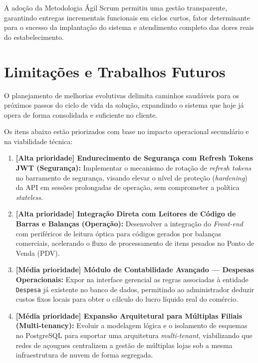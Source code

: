 \documentclass[
	12pt,				%
	openany,			%
	oneside,			%
	a4paper,			%
	english,			%
	french,				%
	spanish,			%
	brazil				%
	]{abntex2}
\begin{document}
A adoção da Metodologia Ágil Scrum permitiu uma gestão transparente, garantindo entregas incrementais funcionais em ciclos curtos, fator determinante para o sucesso da implantação do sistema e atendimento completo das dores reais do estabelecimento.

\section{Limitações e Trabalhos Futuros}

O planejamento de melhorias evolutivas delimita caminhos saudáveis para os próximos passos do ciclo de vida da solução, expandindo o sistema que hoje já opera de forma consolidada e suficiente no cliente.

Os itens abaixo estão priorizados com base no impacto operacional secundário e na viabilidade técnica:

\begin{enumerate}
    \item \textbf{[Alta prioridade] Endurecimento de Segurança com Refresh Tokens JWT (Segurança):} Implementar o mecanismo de rotação de \textit{refresh tokens} no barramento de segurança, visando elevar o nível de proteção (\textit{hardening}) da API em sessões prolongadas de operação, sem comprometer a política \textit{stateless}.
    
    \item \textbf{[Alta prioridade] Integração Direta com Leitores de Código de Barras e Balanças (Operação):} Desenvolver a integração do \textit{Front-end} com periféricos de leitura óptica para códigos gerados por balanças comerciais, acelerando o fluxo de processamento de itens pesados no Ponto de Venda (PDV).
    
    \item \textbf{[Média prioridade] Módulo de Contabilidade Avançado --- Despesas Operacionais:} Expor na interface gerencial as regras associadas à entidade \texttt{Despesa} já existente no banco de dados, permitindo ao administrador deduzir custos fixos locais para obter o cálculo do lucro líquido real do comércio.
    
    \item \textbf{[Média prioridade] Expansão Arquitetural para Múltiplas Filiais (Multi-tenancy):} Evoluir a modelagem lógica e o isolamento de esquemas no PostgreSQL para suportar uma arquitetura \textit{multi-tenant}, viabilizando que redes de açougues centralizem a gestão de múltiplas lojas sob a mesma infraestrutura de nuvem de forma segregada.
    
\end{enumerate}
\end{document}
